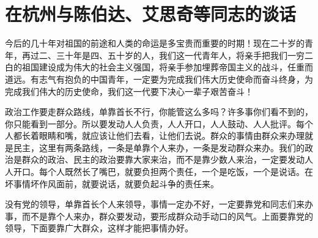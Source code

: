 \section[在杭州与陈伯达、艾思奇等同志的谈话（一九六五年十二月二十一日）]{在杭州与陈伯达、艾思奇等同志的谈话}


今后的几十年对祖国的前途和人类的命运是多宝贵而重要的时期！现在二十岁的青年，再过二、三十年是四、五十岁的人，我们这一代青年人，将亲手把我们一穷二白的祖国建设成为伟大的社会主义强国，将亲手参加埋葬帝国主义的战斗，任重而道远。有志气有抱负的中国青年，一定要为完成我们伟大历史使命而奋斗终身，为完成我们伟大的历史使命，我们这一代要下决心一辈子艰苦奋斗！

政治工作要走群众路线，单靠首长不行，你能管这么多吗？许多事你们看不到的，你只能看到一部分。所以要发动人人负责，人人开口，人人鼓动、人人批评。每个人都长着眼睛和嘴，就应该让他们去看，让他们去说。群众的事情由群众来办理就是民主，这里有两条路线，一条是单靠个人来办，一条是发动群众来办。我们的政治是群众的政治、民主的政治要靠大家来治，而不是靠少数人来治，一定要发动人人开口。每个人既然长了嘴巴，就要负担两个责任，一个是吃饭，一个是说话。在坏事情坏作风面前，就要说话，就要负起斗争的责任来。

没有党的领导，单靠首长个人来领导，事情一定办不好，一定要靠党和同志们来办事，而不是靠个人来办，群众要发动，要形成群众动手动口的风气。上面要靠党的领导，下面要靠广大群众，这样才能把事情办好。


